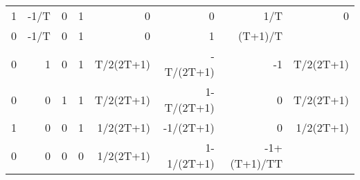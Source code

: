 \begin{table}[ht]
\begin{tabular}{rrrlrrrr}
        1      & -1/T       & 0  & 1  & 0         & 0          & 1/T         & 0         \\
        0      & -1/T       & 0  & 1  & 0         & 1          & (T+1)/T     &           \\ \hline
        0      & 1          & 0  & 1  & T/2(2T+1) & -T/(2T+1)  & -1          & T/2(2T+1) \\ \hline
        0      & 0          & 1  & 1  & T/2(2T+1) & 1-T/(2T+1) & 0           & T/2(2T+1) \\
        1      & 0          & 0  & 1  & 1/2(2T+1) & -1/(2T+1)  & 0           & 1/2(2T+1) \\ \hline
        0      & 0          & 0  & 0  & 1/2(2T+1) & 1-1/(2T+1) & -1+(T+1)/TT &           \\ \hline
    \end{tabular}
\end{table}

